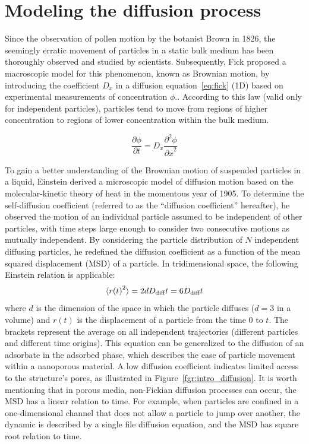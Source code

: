 \documentclass[main]{subfiles}
\begin{document}
\section{Modeling the diffusion process}

Since the observation of pollen motion by the botanist Brown in 1826, the seemingly erratic movement of particles in a static bulk medium has been thoroughly observed and studied by scientists. Subsequently, Fick proposed a macroscopic model for this phenomenon, known as Brownian motion, by introducing the coefficient $D_x$ in a diffusion equation~\ref{eq:fick} (1D) based on experimental measurements of concentration $\phi$.\autocite{Fick_1855}. According to this law (valid only for independent particles), particles tend to move from regions of higher concentration to regions of lower concentration within the bulk medium.

\begin{equation}\label{eq:fick}
  \frac{\partial \phi}{\partial t} = D_x \frac{\partial^2 \phi}{{\partial x}^2}
\end{equation}

To gain a better understanding of the Brownian motion of suspended particles in a liquid, Einstein derived a microscopic model of diffusion motion based on the molecular-kinetic theory of heat in the momentous year of 1905.\autocite{einstein1905motion} To determine the self-diffusion coefficient (referred to as the ``diffusion coefficient'' hereafter), he observed the motion of an individual particle assumed to be independent of other particles, with time steps large enough to consider two consecutive motions as mutually independent. By considering the particle distribution of $N$ independent diffusing particles, he redefined the diffusion coefficient as a function of the mean squared displacement (MSD) of a particle. In tridimensional space, the following Einstein relation is applicable:
\begin{equation}\label{eq:einstein}
  \langle {r(t)}^2 \rangle = 2dD_{\text{diff}}t = 6D_{\text{diff}}t
\end{equation}
where  $d$ is the dimension of the space in which the particle diffuses ($d=3$ in a volume) and $r(t)$ is the displacement of a particle from the time $0$ to $t$. The brackets represent the average on all independent trajectories (different particles and different time origins). This equation can be generalized to the diffusion of an adsorbate in the adsorbed phase, which describes the ease of particle movement within a nanoporous material. A low diffusion coefficient indicates limited access to the structure's pores, as illustrated in Figure~\ref{fgr:intro_diffusion}. It is worth mentioning that in porous media, non-Fickian diffusion processes can occur, the MSD has a linear relation to time. For example, when particles are confined in a one-dimensional channel that does not allow a particle to jump over another, the dynamic is described by a single file diffusion equation, and the MSD has square root relation to time.\autocite{Levitt_1973}
\end{document}
